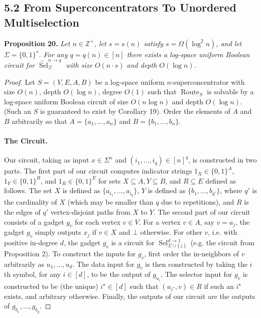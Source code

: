 \documentclass[10pt,a4paper]{article}
\newcommand{\Sel}{\operatorname{Sel}}
\newcommand{\uSel}{\widetilde{\operatorname{Sel}}}
\newcommand{\bits}{\{0,1\}}
\newcommand{\ZZ}{\mathbb Z}
\newenvironment{originalresult}[1]{\par\medskip\noindent\textbf{#1.}\itshape}{\par\medskip}
\begin{document}
\subsection*{5.2 From Superconcentrators To Unordered Multiselection}
\begin{originalresult}{Proposition 20}
Let $n\in\ZZ^+$, let $s=s(n)$ satisfy $s=\Omega(\log^2n)$, and let $\Sigma=\bits^s$. For any $q=q(n)\in[n]$ there exists a log-space uniform Boolean circuit for $\uSel_\Sigma^{n\to q}$ with size $O(n\cdot s)$ and depth $O(\log n)$.
\end{originalresult}
\begin{proof}
Let $S=(V,E,A,B)$ be a log-space uniform $n$-superconcentrator with size $O(n)$, depth $O(\log n)$, degree $O(1)$ such that $\operatorname{Route}_S$ is solvable by a log-space uniform Boolean circuit of size $O(n\log n)$ and depth $O(\log n)$. (Such an $S$ is guaranteed to exist by Corollary 19). Order the elements of $A$ and $B$ arbitrarily so that $A=\{a_1,\ldots,a_n\}$ and $B=\{b_1,\ldots,b_n\}$.
\paragraph{The Circuit.} Our circuit, taking as input $x\in\Sigma^n$ and $(i_1,\ldots,i_q)\in[n]^q$, is constructed in two parts.
The first part of our circuit computes indicator strings $1_X\in\bits^A$, $1_Y\in\bits^B$, and $1_R\in\bits^E$ for sets $X\subseteq A,Y\subseteq B$, and $R\subseteq E$ defined as follows. The set $X$ is defined as $\{a_{i_1},\ldots,a_{i_q}\}$, $Y$ is defined as $\{b_1,\ldots,b_{q'}\}$, where $q'$ is the cardinality of $X$ (which may be smaller than $q$ due to repetitions), and $R$ is the edges of $q'$ vertex-disjoint paths from $X$ to $Y$.
The second part of our circuit consists of a gadget $g_v$ for each vertex $v\in V$. For a vertex $v\in A$, say $v=a_j$, the gadget $g_v$ simply outputs $x_j$ if $v\in X$ and $\bot$ otherwise. For other $v$, i.e. with positive in-degree $d$, the gadget $g_v$ is a circuit for $\Sel_{\Sigma\cup\{\bot\}}^{d\to1}$ (e.g. the circuit from Proposition 2). To construct the inputs for $g_v$, first order the in-neighbors of $v$ arbitrarily as $u_1,\ldots,u_d$. The data input for $g_v$ is then constructed by taking the $i$th symbol, for any $i\in[d]$, to be the output of $g_{u_i}$. The selector input for $g_v$ is constructed to be (the unique) $i^\star\in[d]$ such that $(u_{i^\star},v)\in R$ if such an $i^\star$ exists, and arbitrary otherwise.
Finally, the outputs of our circuit are the outputs of $g_{b_1},\ldots,g_{b_q}$.

\end{proof}
\end{document}
